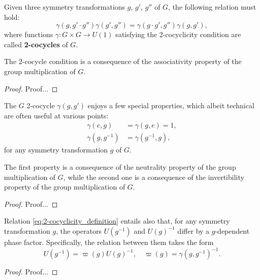 \begin{proposition}
    Given three symmetry transformations \(g\), \(g'\), \(g''\) of \(G\), the following relation must hold:
    \begin{equation}
        \gamma(g, g' \cdot g'') \gamma(g', g'') = \gamma(g \cdot g', g'') \gamma(g, g'),
        \label{eq:2-cocyclicity_definition}
    \end{equation}
    where functions \(\gamma : G \times G \to U(1)\) satisfying the 2-cocyclicity condition are called \textbf{2-cocycles} of \(G\).
\end{proposition}
The 2-cocycle condition is a consequence of the associativity property of the group multiplication of \(G\).
\begin{proof}
    Proof...
\end{proof}

\begin{proposition}
    The \(G\) 2-cocycle \(\gamma(g, g')\) enjoys a few special properties, which albeit technical are often useful at various points:
    \begin{equation}
        \begin{aligned}
            \gamma(e, g)      & = \gamma(g, e) = 1,  \\
            \gamma(g, g^{-1}) & = \gamma(g^{-1}, g),
        \end{aligned}
        \label{eq:2-cocycles_properties}
    \end{equation}
    for any symmetry transformation \(g\) of \(G\).
\end{proposition}
The first property is a consequence of the neutrality property of the group multiplication of \(G\), while the second one is a consequence of the invertibility property of the group multiplication of \(G\).
\begin{proof}
    Proof...
\end{proof}

Relation \eqref{eq:2-cocyclicity_definition} entails also that, for any symmetry transformation \(g\), the operators \(U(g^{-1})\) and \(U(g)^{-1}\) differ by a \(g\)-dependent phase factor. Specifically, the relation between them takes the form
\[
    U(g^{-1}) = \varpi(g) U(g)^{-1}, \quad \varpi(g) = \gamma(g, g^{-1})^{-1}.
\]
\begin{proof}
    Proof...
\end{proof}

